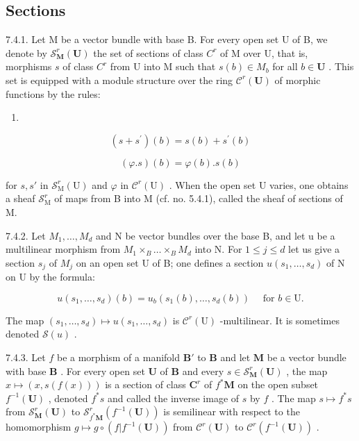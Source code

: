 \subsection{Sections}

7.4.1. Let M be a vector bundle with base B. For every open set U of B, we denote by \(\mathcal{S}_{\mathbf{M}}^{r}(\mathbf{U})\) the set of sections of class \(C^r\) of M over U, that is, morphisms \(s\) of class \(C^r\) from U into M such that \(s(b) \in M_b\) for all \(b \in \mathbf{U}\) . This set is equipped with a module structure over the ring \(\mathcal{C}^r(\mathbf{U})\) of morphic functions by the rules:

\begin{enumerate}
\def\labelenumi{(\arabic{enumi})}
\tightlist
\item
\end{enumerate}

\[
(s + s ^ {\prime}) (b) = s (b) + s ^ {\prime} (b)\tag{2}
\]

\[
(\varphi . s) (b) = \varphi (b). s (b)
\]

for \(s, s'\) in \(\mathcal{S}_{\mathrm{M}}^{r}(\mathrm{U})\) and \(\varphi\) in \(\mathcal{C}^{r}(\mathrm{U})\) . When the open set U varies, one obtains a sheaf \(\mathcal{S}_{\mathrm{M}}^{r}\) of maps from B into M (cf. no. 5.4.1), called the sheaf of sections of M.

7.4.2. Let \(M_{1},\ldots,M_{d}\) and N be vector bundles over the base B, and let u be a multilinear morphism from \(M_{1}\times_{B}\ldots\times_{B}M_{d}\) into N. For \(1\leqslant j\leqslant d\) let us give a section \(s_{j}\) of \(M_{j}\) on an open set U of B; one defines a section \(u(s_{1},\ldots,s_{d})\) of N on U by the formula:

\[
u (s _ {1}, \dots , s _ {d}) (b) = u _ {b} (s _ {1} (b), \dots , s _ {d} (b)) \quad \text {   for   } b \in \mathrm{U}.
\]

The map \((s_1, \ldots, s_d) \mapsto u(s_1, \ldots, s_d)\) is \(\mathcal{C}^r(\mathrm{U})\) -multilinear. It is sometimes denoted \(\mathcal{S}(u)\) .

7.4.3. Let \(f\) be a morphism of a manifold \(\mathbf{B}'\) to \(\mathbf{B}\) and let \(\mathbf{M}\) be a vector bundle with base \(\mathbf{B}\) . For every open set \(\mathbf{U}\) of \(\mathbf{B}\) and every \(s \in \mathcal{S}_{\mathbf{M}}^{r}(\mathbf{U})\) , the map \(x \mapsto (x, s(f(x)))\) is a section of class \(\mathbf{C}^r\) of \(f^{*}\mathbf{M}\) on the open subset \(f^{-1}(\mathbf{U})\) , denoted \(f^{*}s\) and called the inverse image of \(s\) by \(f\) . The map \(s \mapsto f^{*}s\) from \(\mathcal{S}_{\mathbf{M}}^{r}(\mathbf{U})\) to \(\mathcal{S}_{f^{*}\mathbf{M}}^{r}(f^{-1}(\mathbf{U}))\) is semilinear with respect to the homomorphism \(g \mapsto g \circ (f|f^{-1}(\mathbf{U}))\) from \(\mathcal{C}^{r}(\mathbf{U})\) to \(\mathcal{C}^{r}(f^{-1}(\mathbf{U}))\) .

